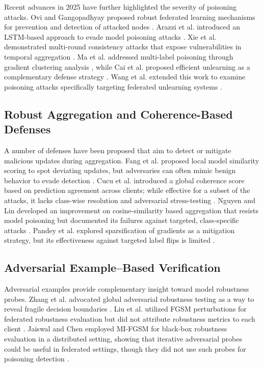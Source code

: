 \documentclass[conference]{IEEEtran}
\begin{document}
Recent advances in 2025 have further highlighted the severity of poisoning attacks. Ovi and Gangopadhyay proposed robust federated learning mechanisms for prevention and detection of attacked nodes \cite{ovi2025robust}. Arazzi et al. introduced an LSTM-based approach to evade model poisoning attacks \cite{arazzi2025evading}. Xie et al. demonstrated multi-round consistency attacks that expose vulnerabilities in temporal aggregation \cite{xie2025multiround}. Ma et al. addressed multi-label poisoning through gradient clustering analysis \cite{ma2025defense}, while Cai et al. proposed efficient unlearning as a complementary defense strategy \cite{cai2025defending}. Wang et al. extended this work to examine poisoning attacks specifically targeting federated unlearning systems \cite{wang2025poisoning}.

\subsection{Robust Aggregation and Coherence-Based Defenses}
A number of defenses have been proposed that aim to detect or mitigate malicious updates during aggregation. Fang et al. proposed local model similarity scoring to spot deviating updates, but adversaries can often mimic benign behavior to evade detection \cite{fang2022local}. Cucu et al. introduced a global coherence score based on prediction agreement across clients; while effective for a subset of the attacks, it lacks class-wise resolution and adversarial stress-testing \cite{cucu2023coherence}. Nguyen and Lin developed an improvement on cosine-similarity based aggregation that resists model poisoning but documented its failures against targeted, class-specific attacks \cite{nguyen2024cosine}. Pandey et al. explored sparsification of gradients as a mitigation strategy, but its effectiveness against targeted label flips is limited \cite{pandey2025sparsification}.


\subsection{Adversarial Example--Based Verification}
Adversarial examples provide complementary insight toward model robustness probes. Zhang et al. advocated global adversarial robustness testing as a way to reveal fragile decision boundaries \cite{zhang2023adv_eval}. Liu et al. utilized FGSM perturbations for federated robustness evaluation but did not attribute robustness metrics to each client \cite{liu2023fgsm_fl}. Jaiswal and Chen employed MI-FGSM for black-box robustness evaluation in a distributed setting, showing that iterative adversarial probes could be useful in federated settings, though they did not use such probes for poisoning detection \cite{jaiswal2025mifgsm}.
\end{document}
